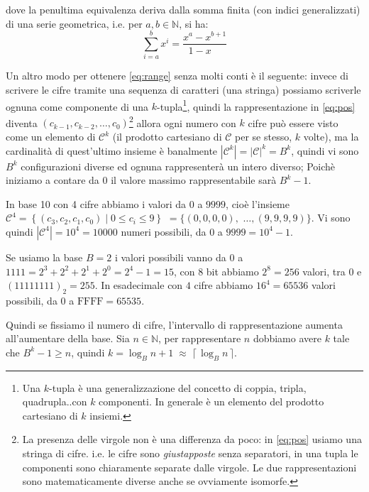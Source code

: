 \noindent dove la penultima equivalenza deriva dalla somma finita (con indici
generalizzati) di una serie geometrica, i.e. per $a,b \in \mathbb{N}$, si ha:
\[ \sum_{i=a}^{b} x^i = \frac{x^a-x^{b+1}}{1-x\quad} \]

Un altro modo  per
ottenere \eqref{eq:range} senza molti conti è il seguente: invece di scrivere
le cifre tramite una sequenza di caratteri (una stringa) possiamo scriverle
ognuna come componente di una $k$-tupla\footnote{Una $k$-tupla è una
generalizzazione del concetto di coppia, tripla, quadrupla..con $k$ componenti.
In generale è un elemento del prodotto cartesiano di $k$ insiemi.}, quindi la
rappresentazione in \eqref{eq:pos} diventa $(c_{k-1}, c_{k-2}, \ldots,
c_0)$\footnote{La presenza delle virgole non è una differenza da poco: in
\eqref{eq:pos} usiamo una stringa di cifre. i.e. le cifre sono
\emph{giustapposte} senza separatori, in una tupla le componenti sono
chiaramente separate dalle virgole. Le due rappresentazioni sono
matematicamente diverse anche se ovviamente isomorfe.} allora ogni numero con
$k$ cifre può essere visto come un elemento di $\mathcal{C}^k$ (il prodotto
cartesiano di $\mathcal{C}$ per se stesso, $k$ volte), ma la cardinalità di
quest'ultimo insieme è banalmente $|\mathcal{C}^k| = |\mathcal{C}|^k = B^k$,
quindi vi sono $B^k$ configurazioni diverse ed ognuna rappresenterà un intero
diverso; Poichè iniziamo a contare da $0$ il valore massimo rappresentabile
sarà $B^k-1$.

\begin{ex} In base 10 con 4 cifre abbiamo i valori da $0$ a $9999$, cioè
l'insieme $\mathcal{C}^4 = \left\{ (c_3,c_2,c_1,c_0) \;|\; 0 \leq c_i \leq 9
\right\}$ $= \{ (0,0,0,0),$ $\ldots, (9,9,9,9) \}$. Vi sono quindi
$|\mathcal{C}^4| = 10^4 = 10000$ numeri possibili, da $0$ a $9999 =
10^4-1$.\medskip

Se usiamo la base $B = 2$ i valori possibili vanno da $0$ a $1111 =
2^3+2^2+2^1+2^0 = 2^4-1 = 15$, con $8$ bit abbiamo $2^8 = 256$ valori, tra $0$
e $(11111111)_2 = 255$. In esadecimale con $4$ cifre abbiamo $16^4 = 65536$ valori possibili, da $0$ a $\text{FFFF} = 65535$.
\end{ex}

Quindi  se
fissiamo il numero di cifre, l'intervallo di rappresentazione aumenta
all'aumentare della base. Sia $n \in \mathbb{N}$, per rappresentare   
$n$ dobbiamo avere $k$ tale che $B^k-1 \geq n$, quindi $k =
\log_B{n+1} \;\approx\; \lceil\, \log_B{n} \,\rceil$.


